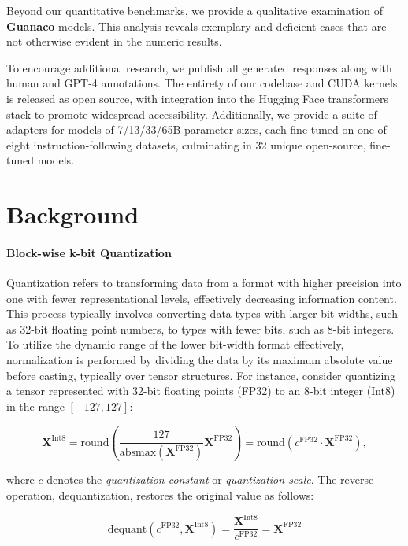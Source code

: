 Beyond our quantitative benchmarks, we provide a qualitative examination of \textbf{Guanaco} models. This analysis reveals exemplary and deficient cases that are not otherwise evident in the numeric results.

To encourage additional research, we publish all generated responses along with human and GPT-4 annotations. The entirety of our codebase and CUDA kernels is released as open source, with integration into the Hugging Face transformers stack \citep{wolf2019huggingface} to promote widespread accessibility. Additionally, we provide a suite of adapters for models of 7/13/33/65B parameter sizes, each fine-tuned on one of eight instruction-following datasets, culminating in 32 unique open-source, fine-tuned models.

\section{Background}
\paragraph{Block-wise k-bit Quantization} Quantization refers to transforming data from a format with higher precision into one with fewer representational levels, effectively decreasing information content. This process typically involves converting data types with larger bit-widths, such as 32-bit floating point numbers, to types with fewer bits, such as 8-bit integers. To utilize the dynamic range of the lower bit-width format effectively, normalization is performed by dividing the data by its maximum absolute value before casting, typically over tensor structures. For instance, consider quantizing a tensor represented with 32-bit floating points (FP32) to an 8-bit integer (Int8) in the range $[-127, 127]$:

\begin{equation}
    \mathbf{X}^{ \text{Int8}} = \text{round}\left( \frac{127}{{\text{absmax}}(\mathbf{X}^{{\text{FP32}}})}\mathbf{X}^{{\text{FP32}}} \right) = \text{round}(c^{\text{FP32}}\cdot \mathbf{X}^{{\text{FP32}}}),
\end{equation}

where $c$ denotes the {\em quantization constant} or {\em quantization scale}. The reverse operation, dequantization, restores the original value as follows:

\begin{equation}
    \text{dequant}(c^{\text{FP32}}, \mathbf{X}^{\text{Int8}}) = \frac{\mathbf{X}^{\text{Int8}}}{c^{\text{FP32}}} = \mathbf{X}^{\text{FP32}}
\end{equation}

